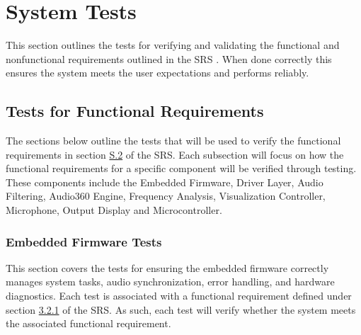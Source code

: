 \documentclass[12pt, titlepage]{article}
\begin{document}
\section{System Tests} \label{sec:system_tests}

This section outlines the tests for verifying and validating the functional and 
nonfunctional requirements outlined in the SRS \citep{SRS}. When done correctly 
this ensures the system meets the user expectations and performs reliably. 

\subsection{Tests for Functional Requirements}

The sections below outline the tests that will be used to verify the functional 
requirements in section \hyperref[SRS-sec:S.2]{S.2} of the SRS. Each subsection 
will focus on how the functional requirements for a specific component will be 
verified through testing. These components include the Embedded Firmware, 
Driver Layer, Audio Filtering, Audio360 Engine, Frequency Analysis, 
Visualization Controller, Microphone, Output Display and Microcontroller. 

\subsubsection{Embedded Firmware Tests}

This section covers the tests for ensuring the embedded firmware correctly 
manages system tasks, audio synchronization, error handling, and hardware 
diagnostics. Each test is associated with a functional requirement defined 
under section \hyperref[SRS-sec:FR1]{3.2.1} of the SRS. As such, each test 
will verify whether the system meets the associated functional requirement.
\end{document}
